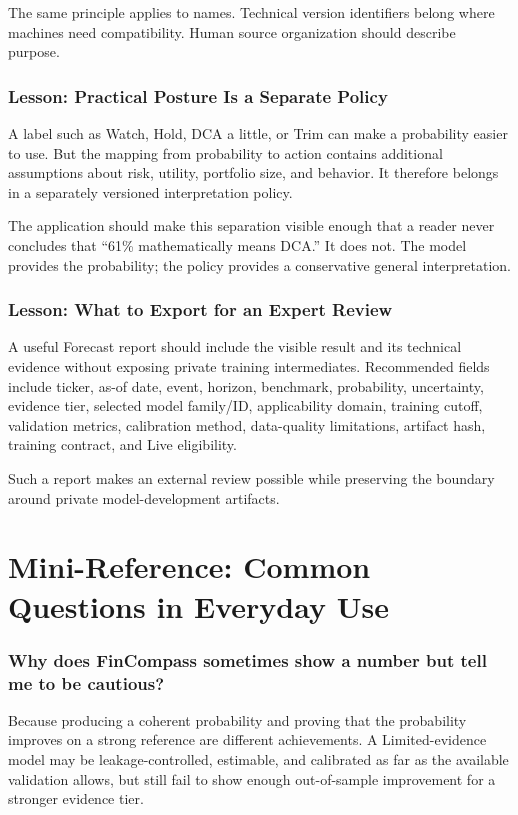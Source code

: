 \documentclass[11pt]{article}
\begin{document}
The same principle applies to names. Technical version identifiers belong where machines need compatibility. Human source organization should describe purpose.

\section{Lesson: Practical Posture Is a Separate Policy}
A label such as Watch, Hold, DCA a little, or Trim can make a probability easier to use. But the mapping from probability to action contains additional assumptions about risk, utility, portfolio size, and behavior. It therefore belongs in a separately versioned interpretation policy.

The application should make this separation visible enough that a reader never concludes that ``61\% mathematically means DCA.'' It does not. The model provides the probability; the policy provides a conservative general interpretation.

\section{Lesson: What to Export for an Expert Review}
A useful Forecast report should include the visible result and its technical evidence without exposing private training intermediates. Recommended fields include ticker, as-of date, event, horizon, benchmark, probability, uncertainty, evidence tier, selected model family/ID, applicability domain, training cutoff, validation metrics, calibration method, data-quality limitations, artifact hash, training contract, and Live eligibility.

Such a report makes an external review possible while preserving the boundary around private model-development artifacts.


\setcounter{section}{0}
\renewcommand{\thesection}{\arabic{section}}

\clearpage
\part{Mini-Reference: Common Questions in Everyday Use}

\section{Why does FinCompass sometimes show a number but tell me to be cautious?}
Because producing a coherent probability and proving that the probability improves on a strong reference are different achievements. A Limited-evidence model may be leakage-controlled, estimable, and calibrated as far as the available validation allows, but still fail to show enough out-of-sample improvement for a stronger evidence tier.
\end{document}
